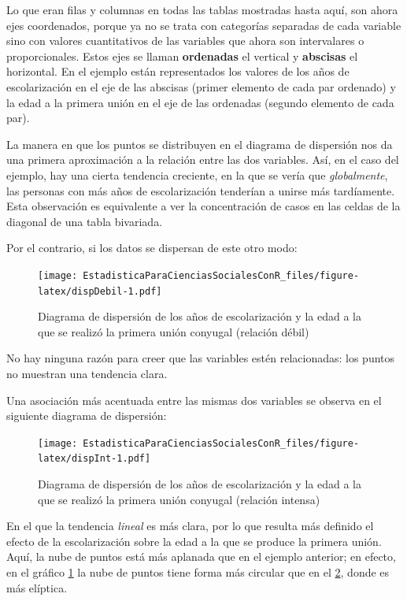 \documentclass[]{book}
\begin{document}
Lo que eran filas y columnas en todas las tablas mostradas hasta aquí, son ahora ejes coordenados, porque ya no se trata con categorías
separadas de cada variable sino con valores cuantitativos de las
variables que ahora son intervalares o proporcionales. Estos ejes se
llaman \textbf{ordenadas} el vertical y \textbf{abscisas} el horizontal. En el
ejemplo están representados los valores de los años de escolarización en el eje de las abscisas (primer elemento de cada par ordenado) y la edad a la primera unión en el eje de las ordenadas (segundo elemento de cada par).

La manera en que los puntos se distribuyen en el diagrama de dispersión nos da una primera aproximación a la relación entre las dos variables.
Así, en el caso del ejemplo, hay una cierta tendencia creciente, en la
que se vería que \emph{globalmente}, las personas con más años de
escolarización tenderían a unirse más tardíamente. Esta observación es
equivalente a ver la concentración de casos en las celdas de la diagonal
de una tabla bivariada.

Por el contrario, si los datos se dispersan de este otro modo:

\begin{figure}
\centering
\texttt{[image: EstadisticaParaCienciasSocialesConR\_files/figure-latex/dispDebil-1.pdf]}
\caption{\label{fig:dispDebil}Diagrama de dispersión de los años de escolarización y la edad a la que se realizó la primera unión conyugal (relación débil)}
\end{figure}

No hay ninguna razón para creer que las variables estén relacionadas:
los puntos no muestran una tendencia clara.

Una asociación más acentuada entre las mismas dos variables se observa en el siguiente diagrama de dispersión:

\begin{figure}
\centering
\texttt{[image: EstadisticaParaCienciasSocialesConR\_files/figure-latex/dispInt-1.pdf]}
\caption{\label{fig:dispInt}Diagrama de dispersión de los años de escolarización y la edad a la que se realizó la primera unión conyugal (relación intensa)}
\end{figure}

En el que la tendencia \emph{lineal} es más clara, por lo que resulta más
definido el efecto de la escolarización sobre la edad a la que se
produce la primera unión. Aquí, la nube de puntos está más aplanada que en el ejemplo anterior; en efecto, en el gráfico \ref{fig:dispDebil} la nube de puntos tiene forma más circular que en el \ref{fig:dispInt}, donde es más elíptica.
\end{document}
